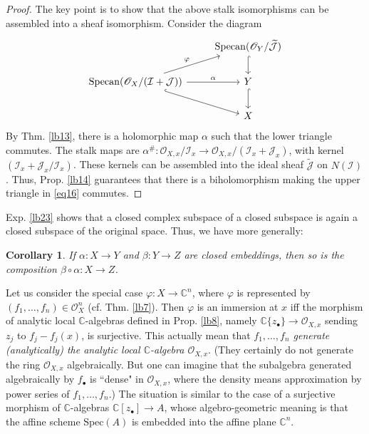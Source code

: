 \documentclass[12pt,b5paper,notitlepage]{report}
\theoremstyle{definition}
\theoremstyle{plain}
\newtheorem{co}[df]{Corollary}
\newcommand{\mc}{\mathcal}
\newcommand{\wtd}{\widetilde}
\newcommand{\scr}{\mathscr}
\newcommand{\blt}{\bullet}
\newcommand{\Cbb}{\mathbb C}
\newcommand{\Specan}{\mathrm{Specan}}
\numberwithin{equation}{section}
\begin{document}
\begin{proof}
The key point is to show that the above stalk isomorphisms can be assembled into a sheaf isomorphism. Consider the diagram
\begin{equation}\label{eq16}
\begin{tikzcd}
                                             & \Specan(\scr O_Y/\wtd{\mc J}) \arrow[d, hook] \\
\Specan(\scr O_X/(\mc I+\mc J)) \arrow[r, "\alpha"] \arrow[rd,hook ] \arrow[ru,"\varphi"] & Y \arrow[d, hook] \\
                                             & X                
\end{tikzcd}
\end{equation}
By Thm. \ref{lb13}, there is a holomorphic map $\alpha$ such that the lower triangle commutes. The stalk maps are $\alpha^\#:\scr O_{X,x}/\mc I_x\rightarrow\scr O_{X,x}/(\mc I_x+\mc J_x)$, with kernel $(\mc I_x+\mc J_x/\mc I_x)$. These kernels can be assembled into the ideal sheaf $\wtd{\mc J}$ on $N(\mc I)$. Thus, Prop. \ref{lb14} guarantees that there is a biholomorphism making the upper triangle in \eqref{eq16} commutes.
\end{proof}



Exp. \ref{lb23} shows that a closed complex subspace of a closed subspace is again a closed subspace of the original space. Thus, we have more generally:
\begin{co}\label{lb81}
If $\alpha:X\rightarrow Y$ and $\beta:Y\rightarrow Z$ are closed embeddings, then so is the composition $\beta\circ\alpha:X\rightarrow Z$.
\end{co}











Let us consider the special case $\varphi:X\rightarrow\Cbb^n$, where $\varphi$ is represented by $(f_1,\dots,f_n)\in\scr O_X^n$ (cf. Thm. \ref{lb7}). Then $\varphi$ is an immersion at $x$ iff the morphism of analytic local $\Cbb$-algebras  defined in Prop. \ref{lb8}, namely $\Cbb\{z_\blt\}\rightarrow\scr O_{X,x}$ sending $z_j$ to $f_j-f_j(x)$, is surjective. This actually mean that \textit{$f_1,\dots,f_n$ generate (analytically) the analytic local $\Cbb$-algebra $\scr O_{X,x}$}. (They certainly do not generate the ring $\scr O_{X,x}$ algebraically. But one can imagine that the subalgebra generated algebraically by $f_\blt$ is ``dense" in $\scr O_{X,x}$, where the density means approximation by power series of $f_1,\dots,f_n$.) The situation is similar to the case of a surjective morphism of $\Cbb$-algebras $\Cbb[z_\blt]\rightarrow A$, whose algebro-geometric meaning is that the affine scheme $\mathrm{Spec}(A)$ is embedded into the affine plane $\Cbb^n$.
\end{document}
